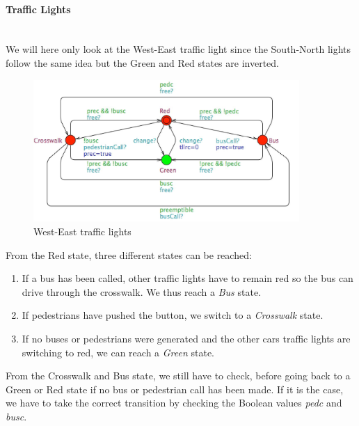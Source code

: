 \paragraph{Traffic Lights} \mbox{}\\
We will here only look at the West-East traffic light since the South-North lights follow the same idea but the Green and Red states are inverted.
\begin{figure}[H]\label{fig:crosswalk}
  \centering
    \includegraphics[width=0.9\textwidth]{picture/leftright.png}
    \caption{West-East traffic lights}
\end{figure}



From the Red state, three different states can be reached:
\begin{enumerate}
  \item If a bus has been called, other traffic lights have to remain red so the bus can drive through the crosswalk. We thus reach a \textit{Bus} state.
  \item If pedestrians have pushed the button, we switch to a \textit{Crosswalk} state.
  \item If no buses or pedestrians were generated and the other cars traffic lights are switching to red, we can reach a \textit{Green} state.
\end{enumerate}
From the Crosswalk and Bus state, we still have to check, before going back to a Green or Red state if no bus or pedestrian call has been made. If it is the case, we have to take the correct transition by checking the Boolean values \textit{pedc} and \textit{busc}.
